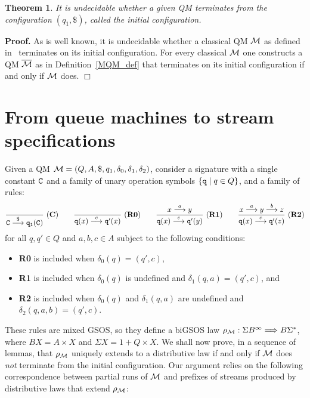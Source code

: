 \documentclass[adraft,copyright,creativecommons]{eptcs}
\newtheorem{theorem}{Theorem}
\newenvironment{proof}[1][Proof]{\noindent\textbf{#1.} }{{\hfill $\Box$ \\}}
\newcommand{\To}{\Longrightarrow}
\newcommand{\Bb}{B^{\infty}}
\newcommand{\Ss}{\Sigma^*}
\renewcommand{\S}{\Sigma}
\newcommand{\goes}[1]{\stackrel{#1}{\longrightarrow}}
\begin{document}
\begin{theorem}\label{thm:qmundecid}\rm
It is undecidable whether a given QM terminates from the configuration $(q_1,\$)$, called the {\em initial configuration}.
\end{theorem}
\begin{proof}
As is well known, it is undecidable whether a classical QM ${\cal M}$ as defined in~\cite{kozen} terminates on its initial configuration.
For every classical ${\cal M}$ one constructs a QM $\overline{\cal M}$ as in Definition~\ref{MQM_def} that terminates on its initial configuration if and only if ${\cal M}$ does.
\end{proof}

\section{From queue machines to stream specifications}\label{sec:qm2ss}\rm

Given a QM ${\cal M}=(Q,A, \$, q_1, \delta_0, \delta_1, \delta_2)$, consider a signature with a single constant ${\tt C}$ and a family of unary operation symbols $\{{\tt q}\mid q\in Q\}$, and a family of rules:
\begin{equation}\label{eq:ssrules}
\dfrac{}{{\tt C}\goes{\$}{\tt q_1(C)}}\ (\textbf{C})
\qquad
\dfrac{}{{\tt q}(x)\goes{c}{\tt q'}(x)}\ (\textbf{R0})
\qquad
\dfrac{x\goes{a}y}{{\tt q}(x)\goes{c}{\tt q'}(y)}\ (\textbf{R1})
\qquad
\dfrac{x\goes{a}y\goes{b}z}{{\tt q}(x)\goes{c}{\tt q'}(z)}\ (\textbf{R2})
\end{equation}
for all $q,q'\in Q$ and $a,b,c\in A$ subject to the following conditions:
\begin{itemize}
\item {\bf R0} is included when $\delta_0(q)=(q',c)$,
\item {\bf R1} is included when $\delta_0(q)$ is undefined and $\delta_1(q,a)=(q',c)$, and
\item {\bf R2} is included when $\delta_0(q)$ and $\delta_1(q,a)$ are undefined and $\delta_2(q,a,b)=(q',c)$.
\end{itemize}
These rules are mixed GSOS, so they define a biGSOS law $\rho_{\cal M}:\S\Bb\To B\Ss$, where $BX=A\times X$ and $\S X = 1+Q\times X$.
We shall now prove, in a sequence of lemmas, that $\rho_{\cal M}$ uniquely extends to a distributive law if and only if ${\cal M}$ does {\em not} terminate from the initial configuration. Our argument relies on the following correspondence between partial runs of ${\cal M}$ and prefixes of streams produced by distributive laws that extend $\rho_{\cal M}$:
\end{document}
